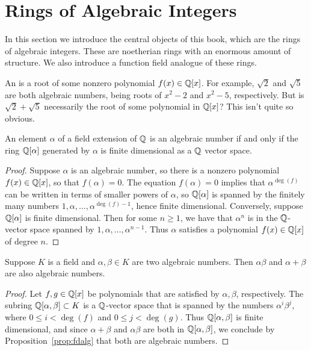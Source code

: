 \section{Rings of Algebraic Integers}
In this section we introduce the central objects of this book, which
are the rings of algebraic integers.  These are noetherian rings with
an enormous amount of structure.  We also introduce a function field
analogue of these rings.


An  is a root of some nonzero polynomial $f(x) \in \mathbb{Q}[x]$.
For example, $\sqrt{2}$ and $\sqrt{5}$ are both algebraic numbers, being 
roots of $x^2-2$ and $x^2-5$, respectively.
But is $\sqrt{2} + \sqrt{5}$ necessarily the root of some polynomial in $\mathbb{Q}[x]$?
This isn't quite so obvious.

\begin{proposition}\label{prop:fdalg}
An element $\alpha$ of a field extension of $\mathbb{Q}$ is an algebraic
number if and only if the ring $\mathbb{Q}[\alpha]$ generated by $\alpha$ is
finite dimensional as a $\mathbb{Q}$ vector space.
\end{proposition}
\begin{proof}
Suppose $\alpha$ is an algebraic number, so there is a nonzero polynomial $f(x)\in\mathbb{Q}[x]$,
so that $f(\alpha)=0$.  The equation $f(\alpha)=0$ implies that
$\alpha^{\deg(f)}$ can be written in terms of smaller powers of $\alpha$, so $\mathbb{Q}[\alpha]$
is spanned by the finitely many numbers $1,\alpha,\ldots,\alpha^{\deg(f)-1}$, hence finite dimensional.
Conversely, suppose $\mathbb{Q}[\alpha]$ is finite dimensional.  Then for some $n\geq 1$, 
we have that $\alpha^n$ is in the $\mathbb{Q}$-vector space spanned by $1,\alpha,\ldots, \alpha^{n-1}$.
Thus $\alpha$ satisfies a polynomial $f(x) \in \mathbb{Q}[x]$ of degree $n$.
\end{proof}

\begin{proposition}\label{prop:algnumfield}
Suppose $K$ is a field and $\alpha, \beta\in K$ are two algebraic
numbers.  Then $\alpha\beta$ and $\alpha+\beta$ are also algebraic numbers.
\end{proposition}
\begin{proof}
Let $f, g\in\mathbb{Q}[x]$ be polynomials that are satisfied by $\alpha,\beta$, respectively.
The subring $\mathbb{Q}[\alpha,\beta]\subset K$ is a $\mathbb{Q}$-vector space that
is spanned by the numbers $\alpha^i\beta^j$, where $0\leq i<\deg(f)$
and $0\leq j<\deg(g)$.  Thus $\mathbb{Q}[\alpha,\beta]$ is finite dimensional, and
since $\alpha+\beta$ and $\alpha\beta$ are both in $\mathbb{Q}[\alpha,\beta]$,
we conclude by Proposition~\ref{prop:fdalg} that both
are algebraic numbers. 
\end{proof}

